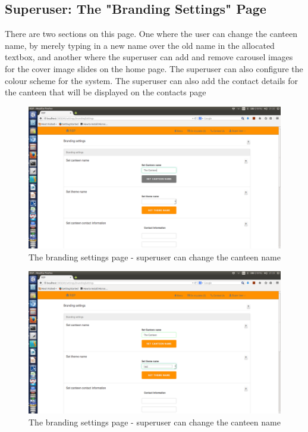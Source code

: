 \documentclass[a4paper,12pt]{report}
\begin{document}
\subsection{Superuser: The "Branding Settings" Page} 
There are two sections on this page. One where the user can change the canteen name, by merely typing in a new name over the old name in the allocated textbox, and another where the superuser can add and remove carousel images for the cover image slides on the home page. The superuser can also configure the colour scheme for the system. The superuser can also add the contact details for the canteen that will be displayed on the contacts page
\begin{figure}[H]
  \centering
    \includegraphics[width=1.0\textwidth]{screenshots/canteenName.png}
    \caption{The branding settings page - superuser can change the canteen name}
\end{figure}

\begin{figure}[H]
  \centering
    \includegraphics[width=1.0\textwidth]{screenshots/setTheme1.png}
    \caption{The branding settings page - superuser can change the canteen name}
\end{figure}
\end{document}
